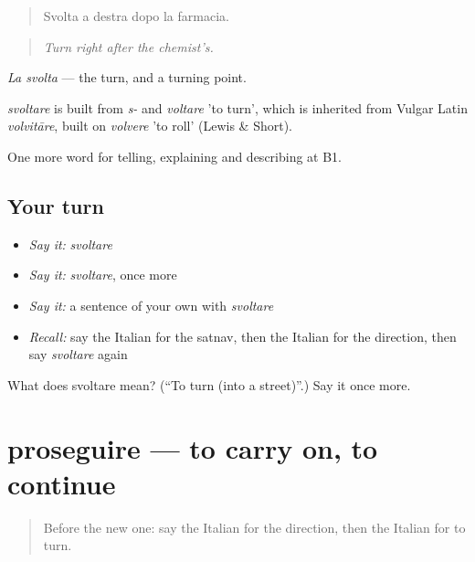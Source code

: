 \begin{quote}
Svolta a destra dopo la farmacia.
\end{quote}

\begin{quote}
\emph{Turn right after the chemist's.}
\end{quote}

\emph{La svolta} — the turn, and a turning point.

\begin{cousinweb}
\emph{svoltare} is built from \emph{s-} and \emph{voltare} 'to turn', which is inherited from Vulgar Latin \emph{volvitāre}, built on \emph{volvere} 'to roll' (Lewis \& Short).
\end{cousinweb}

\begin{grammarlens}[title={What you've built}]
One more word for telling, explaining and describing at B1.
\end{grammarlens}

\subsection*{Your turn}
\begin{itemize}
\raggedright
  \item \emph{Say it:} \emph{svoltare}
  \item \emph{Say it:} \emph{svoltare}, once more
  \item \emph{Say it:} a sentence of your own with \emph{svoltare}
  \item \emph{Recall:} say the Italian for the satnav, then the Italian for the direction, then say \emph{svoltare} again
\end{itemize}

\begin{tcolorbox}[breakable,colback=teal!4,colframe=teal!35!black,title={Before you move on}]
What does svoltare mean? (\textquotedblleft{}To turn (into a street)\textquotedblright{}.) Say it once more.
\end{tcolorbox}
\section[proseguire]{proseguire — to carry on, to continue}

\label{lesson:IT-C440-proseguire}



\begin{quote}
Before the new one: say the Italian for the direction, then the Italian for to turn.
\end{quote}

